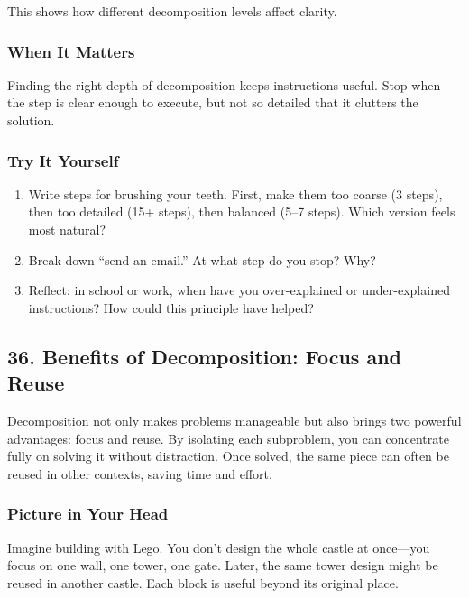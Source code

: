 \documentclass[
  letterpaper,
  DIV=11,
  numbers=noendperiod]{scrreprt}
\providecommand{\tightlist}{%
  \setlength{\itemsep}{0pt}\setlength{\parskip}{0pt}}
\begin{document}
This shows how different decomposition levels affect clarity.

\subsubsection{When It Matters}\label{when-it-matters-32}

Finding the right depth of decomposition keeps instructions useful. Stop
when the step is clear enough to execute, but not so detailed that it
clutters the solution.

\subsubsection{Try It Yourself}\label{try-it-yourself-34}

\begin{enumerate}
\def\labelenumi{\arabic{enumi}.}
\tightlist
\item
  Write steps for brushing your teeth. First, make them too coarse (3
  steps), then too detailed (15+ steps), then balanced (5--7 steps).
  Which version feels most natural?
\item
  Break down ``send an email.'' At what step do you stop? Why?
\item
  Reflect: in school or work, when have you over-explained or
  under-explained instructions? How could this principle have helped?
\end{enumerate}

\subsection{36. Benefits of Decomposition: Focus and
Reuse}\label{benefits-of-decomposition-focus-and-reuse}

Decomposition not only makes problems manageable but also brings two
powerful advantages: focus and reuse. By isolating each subproblem, you
can concentrate fully on solving it without distraction. Once solved,
the same piece can often be reused in other contexts, saving time and
effort.

\subsubsection{Picture in Your Head}\label{picture-in-your-head-35}

Imagine building with Lego. You don't design the whole castle at
once---you focus on one wall, one tower, one gate. Later, the same tower
design might be reused in another castle. Each block is useful beyond
its original place.
\end{document}
